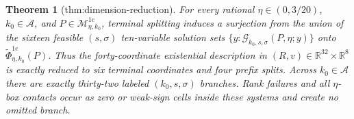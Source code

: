 \documentclass{article}
\newtheorem{theorem}{Theorem}
\begin{document}
\begin{theorem}[thm:dimension-reduction]\label{thm:dimension-reduction}
For every rational \(\eta\in(0,3/20)\), \(k_0\in\mathcal A\), and \(P\in\mathcal M_{\eta,k_0}^{1\mathrm c}\), terminal splitting induces a surjection from the union of the sixteen feasible \((s,\sigma)\) ten-variable solution sets \(\{y:\mathscr G_{k_0,s,\sigma}(P,\eta;y)\}\) onto \(\widetilde\Phi_{\eta,k_0}^{1\mathrm c}(P)\). Thus the forty-coordinate existential description in \((R,v)\in\mathbb R^{32}\times\mathbb R^8\) is exactly reduced to six terminal coordinates and four prefix splits. Across \(k_0\in\mathcal A\) there are exactly thirty-two labeled \((k_0,s,\sigma)\) branches. Rank failures and all \(\eta\)-box contacts occur as zero or weak-sign cells inside these systems and create no omitted branch.
\end{theorem}
\end{document}
